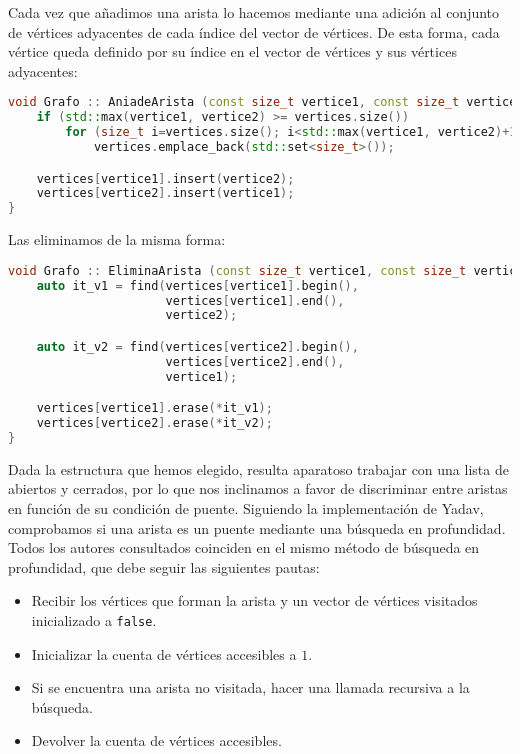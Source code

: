 Cada vez que añadimos una arista lo hacemos mediante una adición al conjunto de vértices adyacentes de cada índice del vector de vértices.
De esta forma, cada vértice queda definido por su índice en el vector de vértices y sus vértices adyacentes:

\begin{lstlisting}[language=C++]
void Grafo :: AniadeArista (const size_t vertice1, const size_t vertice2) {
	if (std::max(vertice1, vertice2) >= vertices.size())
		for (size_t i=vertices.size(); i<std::max(vertice1, vertice2)+1; i++)
			vertices.emplace_back(std::set<size_t>());

	vertices[vertice1].insert(vertice2);
	vertices[vertice2].insert(vertice1);
}
\end{lstlisting}

Las eliminamos de la misma forma:

\begin{lstlisting}[language=C++]
void Grafo :: EliminaArista (const size_t vertice1, const size_t vertice2) {
	auto it_v1 = find(vertices[vertice1].begin(),
	                  vertices[vertice1].end(),
	                  vertice2);

	auto it_v2 = find(vertices[vertice2].begin(),
	                  vertices[vertice2].end(),
	                  vertice1);

	vertices[vertice1].erase(*it_v1);
	vertices[vertice2].erase(*it_v2);
}
\end{lstlisting}

Dada la estructura que hemos elegido, resulta aparatoso trabajar con una lista de abiertos y cerrados, por lo que nos inclinamos a favor de discriminar entre aristas en función de su condición de puente.
Siguiendo la implementación de Yadav, comprobamos si una arista es un puente mediante una búsqueda en profundidad.
Todos los autores consultados coinciden en el mismo método de búsqueda en profundidad, que debe seguir las siguientes pautas:

\begin{itemize}
	\item Recibir los vértices que forman la arista y un vector de vértices visitados inicializado a \texttt{false}.
	\item Inicializar la cuenta de vértices accesibles a $1$.
	\item Si se encuentra una arista no visitada, hacer una llamada recursiva a la búsqueda.
	\item Devolver la cuenta de vértices accesibles.
\end{itemize}

